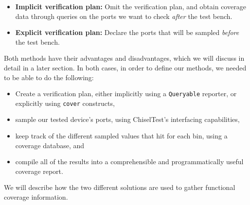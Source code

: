 \documentclass[conference]{IEEEtran}
\begin{document}
\begin{itemize}
	\item \textbf{Implicit verification plan:} Omit the verification plan, and obtain coverage data through queries on the ports we want to check \emph{after} the test bench.
	\item \textbf{Explicit verification plan:} Declare the ports that will be sampled \emph{before} the test bench.
\end{itemize}

Both methods have their advantages and disadvantages, which we will discuss in detail in a later section.
In both cases, in order to define our methods, we needed to be able to do the following:

\begin{itemize}
  \item Create a verification plan, either implicitly using a \texttt{Queryable} reporter, or explicitly using \texttt{cover} constructs, 
  \item sample our tested device's ports, using ChiselTest's interfacing capabilities, 
  \item keep track of the different sampled values that hit for each bin, using a coverage database, and 
  \item compile all of the results into a comprehensible and programmatically useful coverage report.
\end{itemize}

We will describe how the two different solutions are used to gather functional coverage information.
\end{document}
